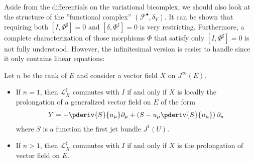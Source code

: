     Aside from the differentials on the variational bicomplex, we should also look at the structure of the ''functional complex'' $(\mathcal{F}^\bullet,\delta_V)$. It can be shown that requiring both $[I,\Phi^\sharp]=0$ and $[\delta,\Phi^\sharp]=0$ is very restricting. Furthermore, a complete characterization of those morphisms $\Phi$ that satisfy only $[I,\Phi^\sharp]=0$ is not fully understood. However, the infinitesimal version is easier to handle since it only contains linear equations:
    \begin{property}
        Let $n$ be the rank of $E$ and consider a vector field $X$ on $J^\infty(E)$.
        \begin{itemize}
            \item If $n=1$, then $\mathcal{L}^\sharp_X$ commutes with $I$ if and only if $X$ is locally the prolongation of a generalized vector field on $E$ of the form
            \begin{gather}
                Y = -\pderiv{S}{u_\mu}\partial_\mu + \left(S - u_\mu\pderiv{S}{u_\mu}\right)\partial_u
            \end{gather}
            where $S$ is a function the first jet bundle $J^1(U)$.
            \item If $n>1$, then $\mathcal{L}^\sharp_X$ commutes with $I$ if and only if $X$ is the prolongation of vector field on $E$.
        \end{itemize}
    \end{property}

